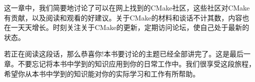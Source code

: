 这一章中，我们简要地讨论了可以在网上找到的CMake社区，这些社区对CMake有贡献，以及阅读和观看的好建议。关于CMake的材料和谈话不计其数，内容也在一天天增长。时刻关注关于CMake的更新，定期访问论坛，使自己处于最新的状态。

若正在阅读这段话，那么恭喜你!本书要讨论的主题已经全部讲完了。这是最后一章。不要忘记将本书中学到的知识应用到你的日常工作中。我们很享受这段旅程，希望你从本书中学到的知识能对你的实际学习和工作有所帮助。